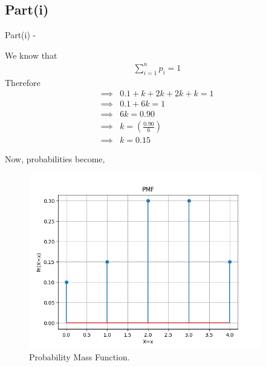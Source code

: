 \documentclass{beamer}
\begin{document}
    \subsection{Part(i)}
    \begin{frame}{Part(i) -}
        
        We know that
        \begin{align}
            \sum_{i = 1}^{n} p_i  = 1
        \end{align}
        Therefore
        \begin{align}
            \implies &0.1 + k + 2k + 2k + k = 1 \\
            \implies &0.1 + 6k = 1 \\
            \implies &6k = 0.90 \\
            \implies &k = \left(\frac{0.90}{6}\right) \\
            \implies &k = 0.15
        \end{align}
    \end{frame}
    \begin{frame}
        Now, probabilities become, 
        \begin{table}[htb]
            \tiny
            \caption{}
            \end{table}
\end{frame}

\begin{frame}
    \begin{figure}[!ht]
        \includegraphics[width=4in, height=3in]{figures/pmf.png}
        \caption{Probability Mass Function.}
    \end{figure}
\end{frame}
\end{document}
